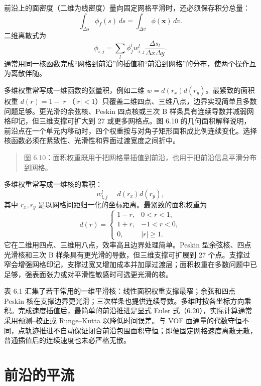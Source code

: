 \documentclass[11pt,a4paper,openany,fontset=none]{ctexbook}
\begin{document}
前沿上的面密度（二维为线密度）量向固定网格平滑时，还必须保存积分总量：
\begin{equation}
\int_{\Delta s}\phi_f(s)\,ds=\int_{\Delta v}\phi(\bm x)\,dv.
\tag{6.16}
\end{equation}
二维离散式为
\begin{equation}
\phi_{i,j}=\sum_l\phi_f^l w_{i,j}^l\frac{\Delta s_l}{\Delta x\Delta y}.
\tag{6.17}
\end{equation}
通常用同一核函数完成“网格到前沿”的插值和“前沿到网格”的分布，使两个操作互为离散伴随。

多维权重常写成一维函数的张量积，例如二维 $w=d(r_x)d(r_y)$。最紧致的面积权重 $d(r)=1-|r|$（$|r|<1$）只覆盖二维四点、三维八点，边界实现简单且多数问题足够。更光滑的余弦核、Peskin 四点核或三次 B 样条具有连续导数并减弱网格印记，但三维支撑可扩大到 27 或更多网格点。图 6.10 的几何面积解释说明，前沿点在一个单元内移动时，四个权重按与对角子矩形面积成比例连续变化。选择核函数必须在紧致性、光滑性和界面过渡宽度之间折中。

\begin{quote}\small 图 6.10：面积权重既用于把网格量插值到前沿，也用于把前沿信息平滑分布到网格。\end{quote}
多维权重常写成一维核的乘积：
\begin{equation}
w_{i,j}^l=d(r_x)d(r_y),
\tag{6.18}
\end{equation}
其中 $r_x,r_y$ 是以网格间距归一化的坐标距离。最紧致的面积权重为
\begin{equation}
d(r)=
\begin{cases}
1-r,&0<r<1,\\
1+r,&-1<r<0,\\
0,&|r|\geq1.
\end{cases}
\tag{6.19}
\end{equation}
它在二维用四点、三维用八点，效率高且边界处理简单。Peskin 型余弦核、四点光滑核和三次 B 样条具有更光滑的导数，但三维支撑可扩展到 27 个点。支撑过窄会增强网格印记，支撑过宽又增加成本并加厚过渡层；面积权重在多数问题中已足够，强表面张力或对平滑性敏感时可选更光滑的核。

表 6.1 汇集了若干常用的一维平滑核：线性面积权重支撑最窄；余弦和四点 Peskin 核在支撑边界更光滑；三次样条也提供连续导数。多维时按各坐标方向乘积。完成速度插值后，最简单的前沿推进是显式 Euler 式（6.20），实际计算通常采用预测--校正或 Runge--Kutta 以降低时间误差。与 VOF 面通量的代数守恒不同，点轨迹推进不自动保证闭合前沿包围面积守恒；即便固定网格速度离散无散，普通插值后的连续速度也未必严格无散。

\section{前沿的平流}
\end{document}
